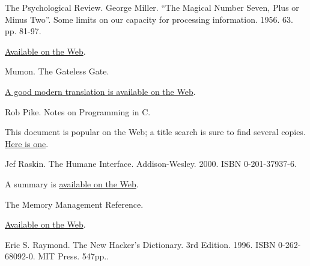 \documentclass[12pt,oneside]{book}
\begin{document}
\begin{common-format}
\begin{thebibliography}{9}
 The Psychological Review. George Miller. “The Magical Number Seven, Plus or Minus Two”. Some limits on our capacity for processing information. 1956. 63. pp. 81-97.

\href{http://www.well.com/user/smalin/miller.html}{Available on the Web}.

 Mumon. The Gateless Gate.

\href{http://www.ibiblio.org/zen/cgi-bin/koan-index.pl}{A good modern translation is available on the Web}.

%
%
%
%
%
%
%
%
%
 Rob Pike. Notes on Programming in C.

This document is popular on the Web; a title search is sure to find several copies. \href{http://www.lysator.liu.se/c/pikestyle.html}{Here is one}.

%
 Jef Raskin. The Humane Interface. Addison-Wesley. 2000. ISBN 0-201-37937-6.

A summary is \href{http://humane.sourceforge.net/humane_interface/summary_of_thi.html}{available on the Web}.

 The Memory Management Reference.

\href{http://www.memorymanagement.org/}{Available on the Web}.

 Eric S. Raymond. The New Hacker's Dictionary. 3rd Edition. 1996. ISBN 0-262-68092-0. MIT Press. 547pp..


\end{thebibliography}
\end{common-format}
\end{document}
